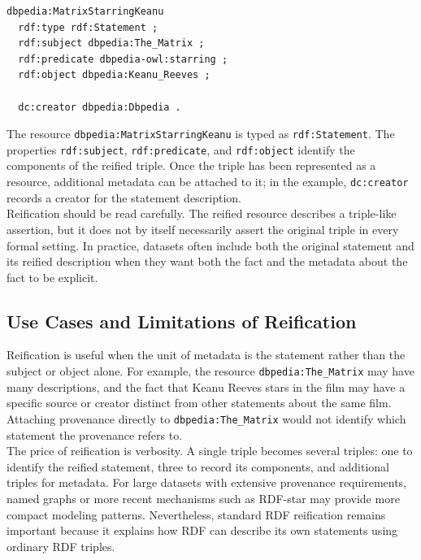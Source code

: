\documentclass{scrbook}
\begin{document}
	\begin{lstlisting}
dbpedia:MatrixStarringKeanu
  rdf:type rdf:Statement ;
  rdf:subject dbpedia:The_Matrix ;
  rdf:predicate dbpedia-owl:starring ;
  rdf:object dbpedia:Keanu_Reeves ;
  
  dc:creator dbpedia:Dbpedia .
	\end{lstlisting}
	
	The resource \texttt{dbpedia:MatrixStarringKeanu} is typed as \texttt{rdf:Statement}. The properties \texttt{rdf:subject}, \texttt{rdf:predicate}, and \texttt{rdf:object} identify the components of the reified triple. Once the triple has been represented as a resource, additional metadata can be attached to it; in the example, \texttt{dc:creator} records a creator for the statement description.\\
	
	Reification should be read carefully. The reified resource describes a triple-like assertion, but it does not by itself necessarily assert the original triple in every formal setting. In practice, datasets often include both the original statement and its reified description when they want both the fact and the metadata about the fact to be explicit.
	
	\subsection{Use Cases and Limitations of Reification}
	
	Reification is useful when the unit of metadata is the statement rather than the subject or object alone. For example, the resource \texttt{dbpedia:The\_Matrix} may have many descriptions, and the fact that Keanu Reeves stars in the film may have a specific source or creator distinct from other statements about the same film. Attaching provenance directly to \texttt{dbpedia:The\_Matrix} would not identify which statement the provenance refers to.\\
	
	The price of reification is verbosity. A single triple becomes several triples: one to identify the reified statement, three to record its components, and additional triples for metadata. For large datasets with extensive provenance requirements, named graphs or more recent mechanisms such as RDF-star may provide more compact modeling patterns. Nevertheless, standard RDF reification remains important because it explains how RDF can describe its own statements using ordinary RDF triples.
	
\end{document}

